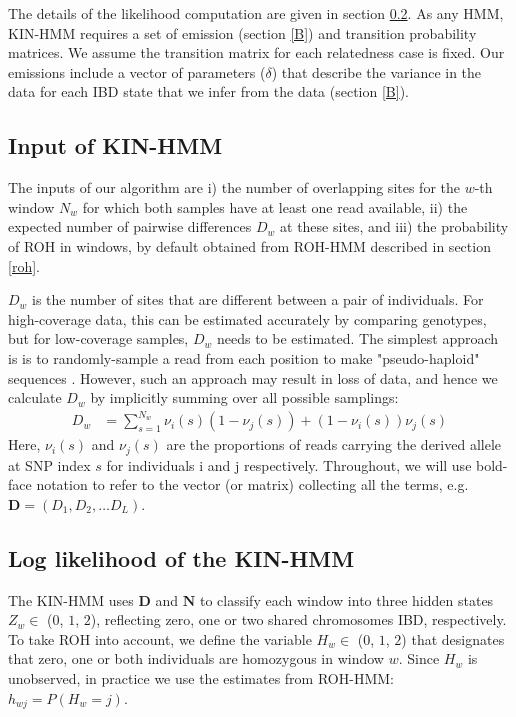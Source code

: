 \documentclass[12pt, letterpaper]{article}
\newcommand{\BD}{\mathbf{D}}
\newcommand{\BN}{\mathbf{N}}
\begin{document}
The details of the likelihood computation are given in section \ref{ll}. As any HMM, KIN-HMM requires a set of emission (section \ref{B}) and transition probability matrices. We assume the transition matrix for each relatedness case is fixed. Our emissions include a vector of parameters ($\delta$) that describe the variance in the data for each IBD state that we infer from the data (section \ref{B}).



\subsection{Input of KIN-HMM}\label{hmm_input}
The inputs of our algorithm are i) the number of overlapping sites for the $w$-th window $N_w$ for which both samples have at least one read available, ii) the expected number of pairwise differences $D_w$ at these sites, and iii) the probability of ROH in windows, by default obtained from ROH-HMM described in section \ref{roh}.

$D_w$ is the number of sites that are different between a pair of individuals. For high-coverage data, this can be estimated accurately by comparing genotypes, but for low-coverage samples, $D_w$ needs to be estimated. The simplest approach is is to  randomly-sample a read from each position to make "pseudo-haploid" sequences \cite{haak_massive_2015}. However, such an approach may result in loss of data, and hence we calculate $D_w$ by implicitly summing over all possible samplings:
\begin{align}\label{eq:x}
D_w &= \sum_{s=1}^{N_w} \nu_i(s) (1-\nu_j(s)) + (1-\nu_i(s)) \nu_j(s)
\end{align}
Here, $\nu_i(s)$ and $\nu_j(s)$ are the proportions of reads carrying the derived allele at SNP index $s$ for individuals i and j respectively.
Throughout, we will use bold-face notation to refer to the vector (or matrix) collecting  all the terms, e.g. $\BD = (D_1, D_2, \dots D_L)$. 


\subsection{Log likelihood of the KIN-HMM}\label{ll}
The KIN-HMM uses $\BD$ and $\BN$ to classify each window into three hidden states $Z_w \in$ ($0$, $1$, $2$), reflecting zero, one or two shared chromosomes IBD, respectively. To take ROH into account, we define the variable $H_w \in$ ($0$, $1$, $2$) that designates that zero, one or both individuals are homozygous in window $w$. Since $H_w$ is unobserved, in practice we use the estimates from ROH-HMM: $h_{wj} = P(H_w = j)$. 
\end{document}
